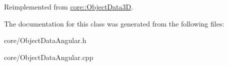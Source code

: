 Reimplemented from \hyperlink{classcore_1_1ObjectData3D_a86216fae3dc86f1107eb1b4530b574d2}{core\+::\+Object\+Data3D}.



The documentation for this class was generated from the following files\+:\begin{DoxyCompactItemize}
\item 
core/Object\+Data\+Angular.\+h\item 
core/Object\+Data\+Angular.\+cpp\end{DoxyCompactItemize}
